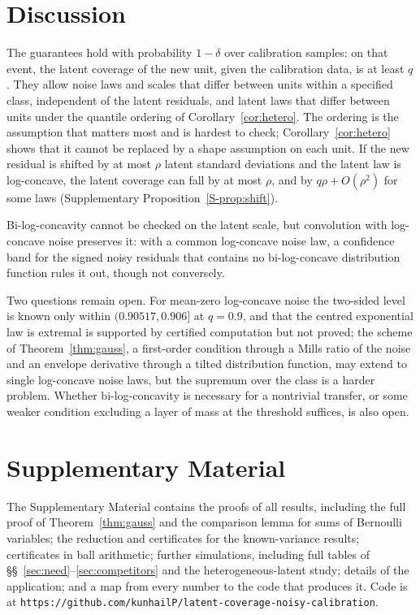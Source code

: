\documentclass[12pt]{article}
\theoremstyle{definition}
\begin{document}
\section{Discussion}\label{sec:discussion}

The guarantees hold with probability $1 - \delta$ over calibration samples: on that event, the latent coverage of the new unit, given the calibration data, is at least $q$. They allow noise laws and scales that differ between units within a specified class, independent of the latent residuals, and latent laws that differ between units under the quantile ordering of Corollary~\ref{cor:hetero}. The ordering is the assumption that matters most and is hardest to check; Corollary~\ref{cor:hetero} shows that it cannot be replaced by a shape assumption on each unit. If the new residual is shifted by at most $\rho$ latent standard deviations and the latent law is log-concave, the latent coverage can fall by at most $\rho$, and by $q\rho + O(\rho^2)$ for some laws (Supplementary Proposition~\ref{S-prop:shift}).

Bi-log-concavity cannot be checked on the latent scale, but convolution with log-concave noise preserves it: with a common log-concave noise law, a confidence band for the signed noisy residuals that contains no bi-log-concave distribution function \citep{dumbgen2017} rules it out, though not conversely.

Two questions remain open. For mean-zero log-concave noise the two-sided level is known only within $(0.90517, 0.906]$ at $q = 0.9$, and that the centred exponential law is extremal is supported by certified computation but not proved; the scheme of Theorem~\ref{thm:gauss}, a first-order condition through a Mills ratio of the noise and an envelope derivative through a tilted distribution function, may extend to single log-concave noise laws, but the supremum over the class is a harder problem. Whether bi-log-concavity is necessary for a nontrivial transfer, or some weaker condition excluding a layer of mass at the threshold suffices, is also open.

\section*{Supplementary Material}

The Supplementary Material contains the proofs of all results, including the full proof of Theorem~\ref{thm:gauss} and the comparison lemma for sums of Bernoulli variables; the reduction and certificates for the known-variance results; certificates in ball arithmetic; further simulations, including full tables of \S\S~\ref{sec:need}--\ref{sec:competitors} and the heterogeneous-latent study; details of the application; and a map from every number to the code that produces it. Code is at \texttt{https://github.com/kunhailP/latent-coverage-noisy-calibration}.
\end{document}
